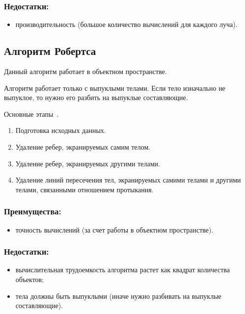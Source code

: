 \subsubsection*{Недостатки:}
\begin{itemize}[label=---]
	\item производительность (большое количество вычислений для каждого луча).
\end{itemize}


\subsection{Алгоритм Робертса}

Данный алгоритм работает в объектном пространстве.

Алгоритм работает только с выпуклыми телами. Если тело изначально не выпуклое, то нужно его разбить на выпуклые составляющие.

Основные этапы~\cite{roberts}. 

\begin{enumerate}
	\item Подготовка исходных данных.
	\item Удаление ребер, экранируемых самим телом.
	\item Удаление ребер, экранируемых другими телами.
	\item Удаление линий пересечения тел, экранируемых самими телами и другими телами, связанными отношением протыкания.
\end{enumerate}

\subsubsection*{Преимущества:}
\begin{itemize}[label=---]
	\item точность вычислений (за счет работы в объектном пространстве).
\end{itemize}

\subsubsection*{Недостатки:}
\begin{itemize}[label=---]
	\item вычислительная трудоемкость алгоритма растет как квадрат количества объектов;
	\item тела должны быть выпуклыми (иначе нужно разбивать на выпуклые составляющие).
\end{itemize}


